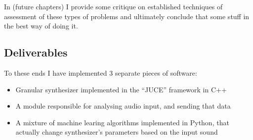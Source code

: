 In (future chapters) I provide some critique on established techniques of
assessment of these types of problems and ultimately conclude that some stuff in
the best way of doing it.

\subsection{Deliverables}

To these ends I have implemented 3 separate pieces of software:  

\begin{itemize}
\item Granular synthesizer implemented in the ``JUCE'' framework in C++
\item A module responsible for analysing audio input, and sending that data
\item A mixture of machine learing algorithms implemented in Python, that
        actually change synthesizer's parameters based on the input sound
\end{itemize}